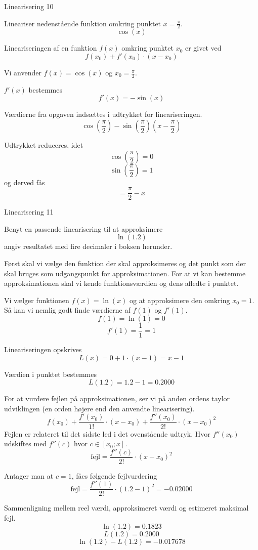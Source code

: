 \documentclass{article}
\begin{document}
\begin{exercise}{Linearisering 10}
	
	Lineariser nedenstående funktion omkring punktet $x = \frac{\pi}{2}$.
	\[
	\cos(x)
	\]
	
	
	\hint
	Lineariseringen af en funktion $f(x)$
	omkring punktet $x_0$ er givet ved
	\[
	f(x_0) + f'(x_0) \cdot (x - x_0)
	\]
	
	\hint
	Vi anvender $f(x) = \cos(x)$ og $x_0 = \frac{\pi}{2}$.
	
	\hint
	$f'(x)$ bestemmes
	\[
	f'(x) = - \sin(x)
	\]
	
	\hint
	Værdierne fra opgaven indsættes i udtrykket for lineariseringen.
	\[
	\cos \left(\frac{\pi}{2}\right) - \sin \left(\frac{\pi}{2} \right) \left(x - \frac{\pi}{2} \right) 
	\]
	
	\hint
	Udtrykket reduceres, idet
	\[
	\cos\left(  \frac{\pi}{2}\right) = 0  
	\]
	\[
	\sin\left(  \frac{\pi}{2}\right) = 1 
	\]
	og derved fås
	\[
	= \frac{\pi}{2} - x
	\]
	
\end{exercise}

\begin{exercise}{Linearisering 11}
	
	Benyt en passende linearisering til at approksimere
	\[
	\ln(1.2)
	\]
	angiv resultatet med fire decimaler i boksen herunder.
	
	\hint
	Først skal vi vælge den funktion der skal approksimeres
	og det punkt som der skal bruges som udgangspunkt for 
	approksimationen.
	For at vi kan bestemme approksimationen skal vi 
	kende funktionsværdien og dens afledte i punktet.
	
	\hint
	Vi vælger funktionen $f(x) = \ln(x)$ og at approksimere den 
	omkring $x_0 = 1$.
	Så kan vi nemlig godt finde værdierne af $f(1)$ og $f'(1)$.
	\[
	f(1) = \ln(1) = 0  
	\]
	\[
	f'(1) = \frac{1}{1} = 1
	\]
	
	\hint
	Lineariseringen opskrives
	\[
	L(x) = 0 + 1 \cdot (x - 1) = x - 1
	\]
	
	\hint
	Værdien i punktet bestemmes
	\[
	L(1.2) = 1.2 - 1 = 0.2000
	\]

	
	\hint
	For at vurdere fejlen på approksimationen, ser vi på anden 
	ordens taylor udviklingen (en orden højere end den 
	anvendte linearisering).
	\[
	f(x_0) 
	+ \frac{f'(x_0)}{1!} \cdot (x - x_0) 
	+ \frac{f''(x_0)}{2!} \cdot (x - x_0)^2
	\]
	Fejlen er relateret til det sidste led i det ovenstående udtryk.
	Hvor $f''(x_0)$ udskiftes med $f''(c)$ hvor $c \in [x_0; x]$.
	\[
	\textrm{fejl} = \frac{f''(c)}{2!} \cdot (x - x_0)^2
	\]
	
	\hint 
	Antager man at $c = 1$, fåes følgende fejlvurdering
	\[
	\textrm{fejl} = \frac{f''(1)}{2!} \cdot (1.2 - 1)^2 = 
	- 0.02000
	\]
	
	\hint
	Sammenligning mellem reel værdi, approksimeret værdi og estimeret maksimal fejl.
	\[
	\ln(1.2)= 0.1823
	\]
	\[
	L(1.2) = 0.2000
	\]
	\[
	\ln(1.2) - L(1.2)  = -0.017678
	\]
	
\end{exercise}
\end{document}
